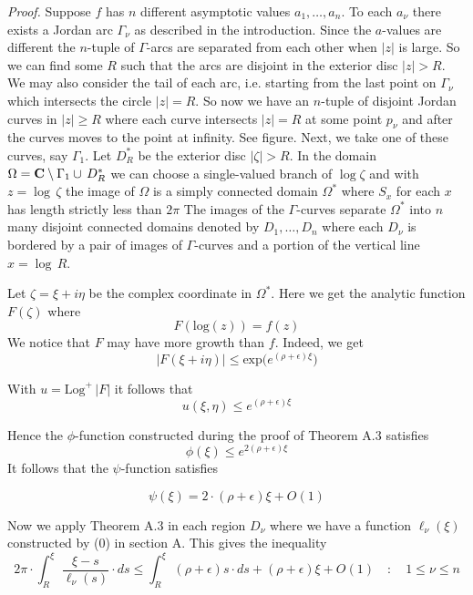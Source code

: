 \documentclass{amsart}
\begin{document}
\noindent
\emph{Proof.}
Suppose $f$ has $n$ different asymptotic values
$a_1,\ldots,a_n$.
To each  $a_\nu$ there exists a Jordan arc $\Gamma_\nu$ as described in the introduction.
Since the $a$-values are different the $n$-tuple of
$\Gamma$-arcs are separated from each other when
$|z|$ is large.
So we can find some $R$ such that
the arcs are disjoint in the exterior disc
$|z|>R$. We may also consider the tail of each arc, i.e. starting from
the last point on $\Gamma_\nu$ which intersects the circle
$|z|=R$. So now we have an $n$-tuple of disjoint Jordan
curves in $|z|\geq R$ where each curve intersects $|z|=R$ at some point $p_\nu$ and after the curves moves to the point at infinity. See figure.
Next, we take one of these curves, say $\Gamma_1$. Let
$D_R^*$ be the exterior disc $|\zeta |>R$.
In the domain
$\Omega={\bf{C}}\setminus \Gamma_1\cup\,D_R^*$ we can choose a single-valued
branch of $\log \zeta$ and with $z=\log\,\zeta $
the image of $\Omega$ is a simply connected domain 
$\Omega^*$
where
$S_x$ for each $x$ has length strictly less than
$2\pi$
The images of the $\Gamma$-curves
separate $\Omega^*$
into $n$ many disjoint connected
domains
denoted by $D_1,\ldots,D_n$ where
each $D_\nu$ is bordered by a pair of images of $\Gamma$-curves
and a portion of the vertical line $x=\log \,R$.

\medskip

\noindent
Let $\zeta=\xi+i\eta$ be the complex coordinate
in $\Omega^*$.
Here we get the analytic function
$F(\zeta)$ where
\[ F(\text{log}(z))= f(z)
\]
We notice that $F$ may have more growth than $f$. Indeed, we get
\[
|F(\xi+i\eta)|\leq \text{exp}\bigl(e^{(\rho+\epsilon)\xi}\bigr)\tag{1}
\]

\medskip

\noindent
With $u=\text{Log}^+\,|F|$ it follows that
\[ 
u(\xi,\eta)\leq e^{(\rho+\epsilon)\xi}\tag{2}
\]


\noindent
Hence the $\phi$-function constructed
during the proof of Theorem A.3  satisfies
\[
\phi(\xi)\leq e^{2(\rho+\epsilon)\xi}
\]
It follows that the $\psi$-function satisfies


\[ 
\psi(\xi)=2\cdot (\rho+\epsilon)\xi+O(1)\tag{3}
\]


\noindent Now we  apply Theorem A.3  in each region $D_\nu$
where we have a function
$\ell_\nu(\xi)$ constructed by (0) in section A. 
This gives the inequality
\[
2\pi\cdot \int_R^\xi\, \frac{\xi-s}{\ell_\nu(s)}\cdot ds\leq
\int_R^\xi\, (\rho+\epsilon)s\cdot ds+(\rho+\epsilon)\xi+O(1)\quad\colon\quad
1\leq \nu\leq n\tag{4}
\]
\medskip
\end{document}
